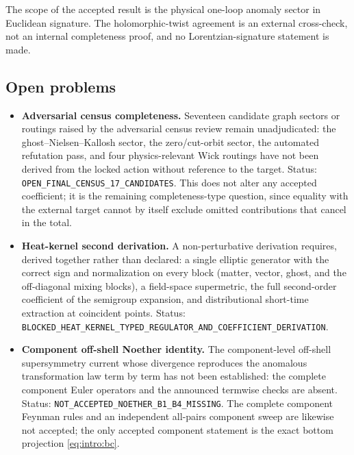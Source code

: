 \begin{remark}\label{rem:concl:scope}
The scope of the accepted result is the physical one-loop anomaly sector in Euclidean signature. The holomorphic-twist
agreement is an external cross-check, not an internal completeness proof, and no Lorentzian-signature statement is made.
\end{remark}

\subsection*{Open problems}

\begin{itemize}[leftmargin=1.6em]

\item \textbf{Adversarial census completeness.} Seventeen candidate graph sectors or routings raised by the adversarial
census review remain unadjudicated: the ghost--Nielsen--Kallosh sector, the zero/cut-orbit sector, the automated
refutation pass, and four physics-relevant Wick routings have not been derived from the locked action without reference
to the target. Status: \texttt{OPEN\_FINAL\_CENSUS\_17\_CANDIDATES}. This does not alter any accepted coefficient; it is
the remaining completeness-type question, since equality with the external target cannot by itself exclude omitted
contributions that cancel in the total.

\item \textbf{Heat-kernel second derivation.} A non-perturbative derivation requires, derived together rather than
declared: a single elliptic generator with the correct sign and normalization on every block (matter, vector, ghost, and
the off-diagonal mixing blocks), a field-space supermetric, the full second-order coefficient of the semigroup expansion,
and distributional short-time extraction at coincident points. Status:
\texttt{BLOCKED\_HEAT\_KERNEL\_TYPED\_REGULATOR\_AND\_COEFFICIENT\_DERIVATION}.

\item \textbf{Component off-shell Noether identity.} The component-level off-shell supersymmetry current whose divergence
reproduces the anomalous transformation law term by term has not been established: the complete component Euler operators
and the announced termwise checks are absent. Status: \texttt{NOT\_ACCEPTED\_NOETHER\_B1\_B4\_MISSING}. The complete
component Feynman rules and an independent all-pairs component sweep are likewise not accepted; the only accepted
component statement is the exact bottom projection \eqref{eq:intro:bc}.


\end{itemize}
